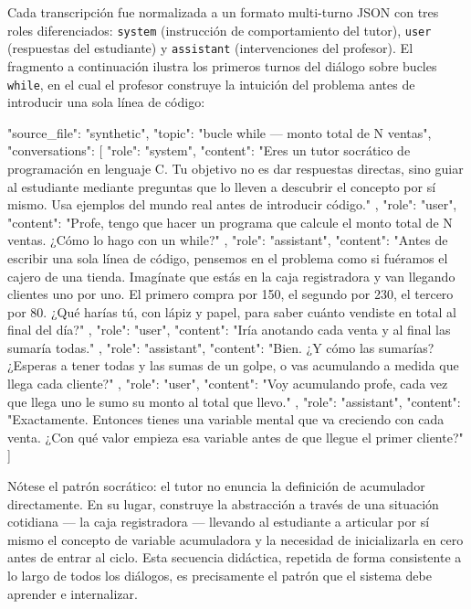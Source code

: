 \documentclass[12pt]{article}
\begin{document}
Cada transcripción fue normalizada a un formato multi-turno JSON con tres roles
diferenciados: \texttt{system} (instrucción de comportamiento del tutor),
\texttt{user} (respuestas del estudiante) y \texttt{assistant} (intervenciones
del profesor). El fragmento a continuación ilustra los primeros turnos del
diálogo sobre bucles \texttt{while}, en el cual el profesor construye la
intuición del problema antes de introducir una sola línea de código:

\begin{jsoncode}
{
  "source_file": "synthetic",
  "topic": "bucle while — monto total de N ventas",
  "conversations": [
    {
      "role": "system",
      "content": "Eres un tutor socrático de programación en lenguaje C.
Tu objetivo no es dar respuestas directas, sino guiar al estudiante
mediante preguntas que lo lleven a descubrir el concepto por sí mismo.
Usa ejemplos del mundo real antes de introducir código."
    },
    {
      "role": "user",
      "content": "Profe, tengo que hacer un programa que calcule el monto
total de N ventas. ¿Cómo lo hago con un while?"
    },
    {
      "role": "assistant",
      "content": "Antes de escribir una sola línea de código, pensemos en
el problema como si fuéramos el cajero de una tienda. Imagínate que estás
en la caja registradora y van llegando clientes uno por uno. El primero
compra por 150, el segundo por 230, el tercero por 80. ¿Qué harías tú,
con lápiz y papel, para saber cuánto vendiste en total al final del día?"
    },
    {
      "role": "user",
      "content": "Iría anotando cada venta y al final las sumaría todas."
    },
    {
      "role": "assistant",
      "content": "Bien. ¿Y cómo las sumarías? ¿Esperas a tener todas y las
sumas de un golpe, o vas acumulando a medida que llega cada cliente?"
    },
    {
      "role": "user",
      "content": "Voy acumulando profe, cada vez que llega uno le sumo su
monto al total que llevo."
    },
    {
      "role": "assistant",
      "content": "Exactamente. Entonces tienes una variable mental que va
creciendo con cada venta. ¿Con qué valor empieza esa variable antes de
que llegue el primer cliente?"
    }
  ]
}
\end{jsoncode}

Nótese el patrón socrático: el tutor no enuncia la definición de acumulador
directamente. En su lugar, construye la abstracción a través de una situación
cotidiana — la caja registradora — llevando al estudiante a articular por sí
mismo el concepto de variable acumuladora y la necesidad de inicializarla en
cero antes de entrar al ciclo. Esta secuencia didáctica, repetida de forma
consistente a lo largo de todos los diálogos, es precisamente el patrón que el
sistema debe aprender e internalizar.
\end{document}
